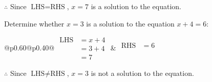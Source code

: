 \documentclass[12pt]{article}
\newcounter{minipagecount}
\begin{document}
\begin{multicols}{2}
\begin{minipage}[t]{0.40\textwidth}
    \noindent \(\therefore\) Since \(\text{LHS} = \text{RHS}\), \(x = 7\) is  a solution to the equation.

\end{minipage}

 \vspace*{16pt}
\noindent{(\theminipagecount)}\hspace{0.1mm} %
\begin{minipage}[t]{0.40\textwidth} %

    \noindent Determine whether \(x = 3\) is a solution to the equation \(x + 4 = 6\):
    \vspace{4pt}  %

    \noindent
    \renewcommand{\arraystretch}{1.3} %
    \begin{tabular}{@{}p{0.60\linewidth}@{}p{0.40\linewidth}@{}}
        \(\begin{aligned}
            \text{LHS} &= x + 4 \\
                    &= 3 + 4 \\
                    &= 7
        \end{aligned}\) &
        \(\begin{aligned}
            \text{RHS} &= 6\\
                    & \\
                    &
        \end{aligned}\)
    \end{tabular}
    \renewcommand{\arraystretch}{1.0} %
    \vspace{2pt}  %

    \noindent \(\therefore\) Since \(\text{LHS} \neq \text{RHS}\), \(x = 3\) is not  a solution to the equation.

\end{minipage}

 \vspace*{16pt}
\noindent{(\theminipagecount)}\hspace{0.1mm} %
\begin{minipage}[t]{0.40\textwidth} %


\end{minipage}
\end{multicols}
\end{document}
